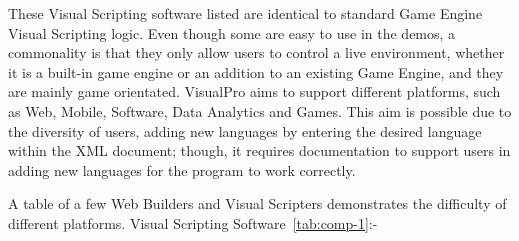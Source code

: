 \documentclass[12pt]{report} %
\begin{document}
			These Visual Scripting software listed are identical to standard Game Engine Visual Scripting logic. Even though some are easy to use in the demos, a commonality is that they only allow users to control a live environment, whether it is a built-in game engine or an addition to an existing Game Engine, and they are mainly game orientated. VisualPro aims to support different platforms, such as Web, Mobile, Software, Data Analytics and Games. This aim is possible due to the diversity of users, adding new languages by entering the desired language within the XML document; though, it requires documentation to support users in adding new languages for the program to work correctly.

			A table of a few Web Builders and Visual Scripters demonstrates the difficulty of different platforms. Visual Scripting Software~\ref{tab:comp-1}:-
\end{document}
